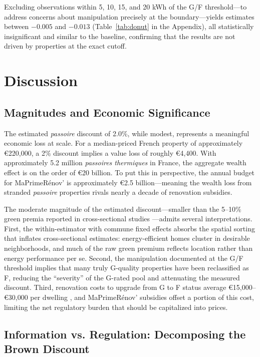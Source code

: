 \documentclass[12pt]{article}
\begin{document}
Excluding observations within 5, 10, 15, and 20 kWh of the G/F threshold---to address concerns about manipulation precisely at the boundary---yields estimates between $-0.005$ and $-0.013$ (Table~\ref{tab:donut} in the Appendix), all statistically insignificant and similar to the baseline, confirming that the results are not driven by properties at the exact cutoff.


\section{Discussion}

\subsection{Magnitudes and Economic Significance}

The estimated \textit{passoire} discount of 2.0\%, while modest, represents a meaningful economic loss at scale. For a median-priced French property of approximately \euro{}220,000, a 2\% discount implies a value loss of roughly \euro{}4,400. With approximately 5.2 million \textit{passoires thermiques} in France, the aggregate wealth effect is on the order of \euro{}20 billion. To put this in perspective, the annual budget for MaPrimeR\'enov' is approximately \euro{}2.5 billion---meaning the wealth loss from stranded \textit{passoire} properties rivals nearly a decade of renovation subsidies.

The moderate magnitude of the estimated discount---smaller than the 5--10\% green premia reported in cross-sectional studies \citep{brounen2013energy, dequiedt2018greenium}---admits several interpretations. First, the within-estimator with commune fixed effects absorbs the spatial sorting that inflates cross-sectional estimates: energy-efficient homes cluster in desirable neighborhoods, and much of the raw green premium reflects location rather than energy performance per se. Second, the manipulation documented at the G/F threshold implies that many truly G-quality properties have been reclassified as F, reducing the ``severity'' of the G-rated pool and attenuating the measured discount. Third, renovation costs to upgrade from G to F status average \euro{}15,000--\euro{}30,000 per dwelling \citep{desLandes2024renovation}, and MaPrimeR\'enov' subsidies offset a portion of this cost, limiting the net regulatory burden that should be capitalized into prices.

\subsection{Information vs. Regulation: Decomposing the Brown Discount}
\end{document}
